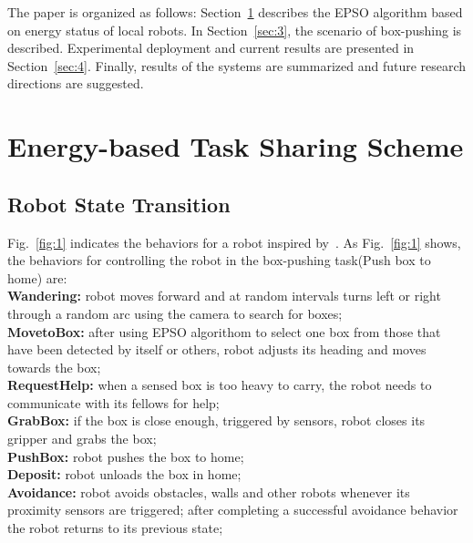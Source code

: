 \documentclass[journal]{IEEEtran}
\begin{document}
The paper is organized as follows: Section~\ref{sec:2} describes the EPSO algorithm based on energy status of local robots. In Section~\ref{sec:3}, the scenario of box-pushing is described. Experimental deployment and current results are presented in Section~\ref{sec:4}. Finally, results of the systems are summarized and future research directions are suggested.
\section{Energy-based Task Sharing Scheme}
\label{sec:2}
\subsection{Robot State Transition}
\label{subsec:1}
Fig.~\ref{fig:1} indicates the behaviors for a robot inspired by~\cite{Jones}. As Fig.~\ref{fig:1} shows, the behaviors for controlling the robot in the box-pushing task(Push box to home) are:\\
\textbf{Wandering:} robot moves forward and at random intervals turns left or right through a random arc using the camera to search for boxes;\\
\textbf{MovetoBox:} after using EPSO algorithom to select one box from those that have been detected by itself or others, robot adjusts its heading and moves towards the box;\\
\textbf{RequestHelp:} when a sensed box is too heavy to carry, the robot needs to communicate with its fellows for help;\\
\textbf{GrabBox:} if the box is close enough, triggered by sensors, robot closes its gripper and grabs the box;\\
\textbf{PushBox:} robot pushes the box to home;\\
\textbf{Deposit:} robot unloads the box in home;\\
\textbf{Avoidance:} robot avoids obstacles, walls and other robots whenever its proximity sensors are triggered; after completing a successful avoidance behavior the robot returns to its previous state;
\end{document}
